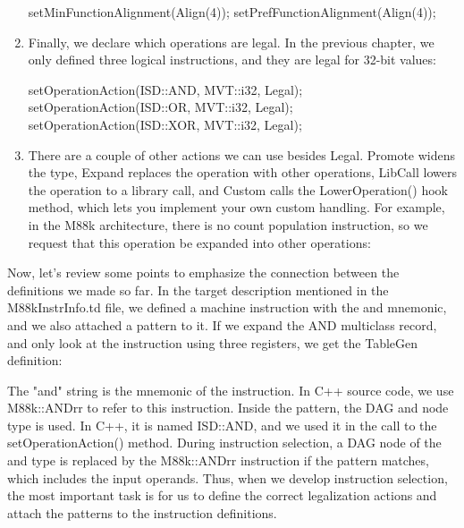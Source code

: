 \begin{enumerate}
\begin{cpp}
setMinFunctionAlignment(Align(4));
setPrefFunctionAlignment(Align(4));
\end{cpp}

\item
Finally, we declare which operations are legal. In the previous chapter, we only defined three logical instructions, and they are legal for 32-bit values:

\begin{cpp}
setOperationAction(ISD::AND, MVT::i32, Legal);
setOperationAction(ISD::OR, MVT::i32, Legal);
setOperationAction(ISD::XOR, MVT::i32, Legal);
\end{cpp}

\item
There are a couple of other actions we can use besides Legal. Promote widens the type, Expand replaces the operation with other operations, LibCall lowers the operation to a library call, and Custom calls the LowerOperation() hook method, which lets you implement your own custom handling. For example, in the M88k architecture, there is no count population instruction, so we request that this operation be expanded into other operations:

\begin{cpp}
    setOperationAction(ISD::CTPOP, MVT::i32, Expand);
}
\end{cpp}
\end{enumerate}

Now, let’s review some points to emphasize the connection between the definitions we made so far. In the target description mentioned in the M88kInstrInfo.td file, we defined a machine instruction with the and mnemonic, and we also attached a pattern to it. If we expand the AND multiclass record, and only look at the instruction using three registers, we get the TableGen definition:


The "and" string is the mnemonic of the instruction. In C++ source code, we use M88k::ANDrr to refer to this instruction. Inside the pattern, the DAG and node type is used. In C++, it is named ISD::AND, and we used it in the call to the setOperationAction() method. During instruction selection, a DAG node of the and type is replaced by the M88k::ANDrr instruction if the pattern matches, which includes the input operands. Thus, when we develop instruction selection, the most important task is for us to define the correct legalization actions and attach the patterns to the instruction definitions.

